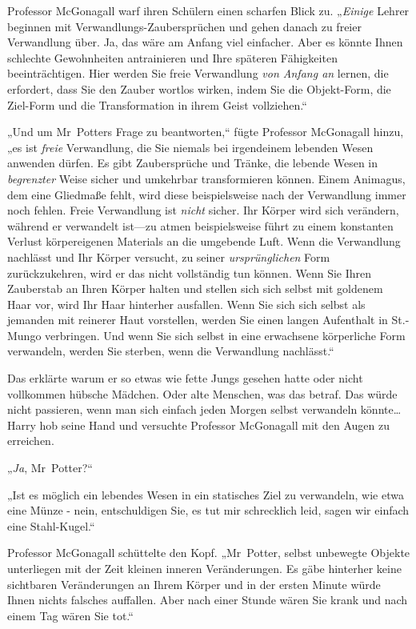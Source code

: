 {Professor McGonagall warf ihren Schülern einen scharfen Blick zu. „\emph{Einige} Lehrer beginnen mit Verwandlungs-Zaubersprüchen und gehen danach zu freier Verwandlung über. Ja, das wäre am Anfang viel einfacher. Aber es könnte Ihnen schlechte Gewohnheiten antrainieren und Ihre späteren Fähigkeiten beeinträchtigen. Hier werden Sie freie Verwandlung \emph{von Anfang an} lernen, die erfordert, dass Sie den Zauber wortlos wirken, indem Sie die Objekt-Form, die Ziel-Form und die Transformation in ihrem Geist vollziehen.“

„Und um Mr~Potters Frage zu beantworten,“ fügte Professor McGonagall hinzu, „es ist \emph{freie} Verwandlung, die Sie niemals bei irgendeinem lebenden Wesen anwenden dürfen. Es gibt Zaubersprüche und Tränke, die lebende Wesen in \emph{begrenzter} Weise sicher und umkehrbar transformieren können. Einem Animagus, dem eine Gliedmaße fehlt, wird diese beispielsweise nach der Verwandlung immer noch fehlen. Freie Verwandlung ist \emph{nicht} sicher. Ihr Körper wird sich verändern, während er verwandelt ist—zu atmen beispielsweise führt zu einem konstanten Verlust körpereigenen Materials an die umgebende Luft. Wenn die Verwandlung nachlässt und Ihr Körper versucht, zu seiner \emph{ursprünglichen} Form zurückzukehren, wird er das nicht vollständig tun können. Wenn Sie Ihren Zauberstab an Ihren Körper halten und stellen sich sich selbst mit goldenem Haar vor, wird Ihr Haar hinterher ausfallen. Wenn Sie sich sich selbst als jemanden mit reinerer Haut vorstellen, werden Sie einen langen Aufenthalt in St.-Mungo verbringen. Und wenn Sie sich selbst in eine erwachsene körperliche Form verwandeln, werden Sie sterben, wenn die Verwandlung nachlässt.“

Das erklärte warum er so etwas wie fette Jungs gesehen hatte oder nicht vollkommen hübsche Mädchen. Oder alte Menschen, was das betraf. Das würde nicht passieren, wenn man sich einfach jeden Morgen selbst verwandeln könnte… Harry hob seine Hand und versuchte Professor McGonagall mit den Augen zu erreichen.

„\emph{Ja}, Mr~Potter?“

„Ist es möglich ein lebendes Wesen in ein statisches Ziel zu verwandeln, wie etwa eine Münze - nein, entschuldigen Sie, es tut mir schrecklich leid, sagen wir einfach eine Stahl-Kugel.“

Professor McGonagall schüttelte den Kopf. „Mr~Potter, selbst unbewegte Objekte unterliegen mit der Zeit kleinen inneren Veränderungen. Es gäbe hinterher keine sichtbaren Veränderungen an Ihrem Körper und in der ersten Minute würde Ihnen nichts falsches auffallen. Aber nach einer Stunde wären Sie krank und nach einem Tag wären Sie tot.“

}
